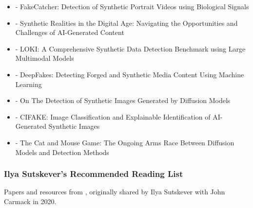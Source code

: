 \documentclass[
  letterpaper,
  DIV=11,
  numbers=noendperiod]{scrartcl}
\providecommand{\tightlist}{%
  \setlength{\itemsep}{0pt}\setlength{\parskip}{0pt}}
\begin{document}
\begin{itemize}
\tightlist
\item
  \autocite{9141516} - FakeCatcher: Detection of Synthetic Portrait
  Videos using Biological Signals
\item
  \autocite{unknown} - Synthetic Realities in the Digital Age:
  Navigating the Opportunities and Challenges of AI-Generated Content
\item
  \autocite{ye2025lokicomprehensivesyntheticdata} - LOKI: A
  Comprehensive Synthetic Data Detection Benchmark using Large
  Multimodal Models
\item
  \autocite{Zobaed2021} - DeepFakes: Detecting Forged and Synthetic
  Media Content Using Machine Learning
\item
  \autocite{10095167} - On The Detection of Synthetic Images Generated
  by Diffusion Models
\item
  \autocite{10409290} - CIFAKE: Image Classification and Explainable
  Identification of AI-Generated Synthetic Images
\item
  \autocite{laurier2024catmousegameongoing} - The Cat and Mouse Game:
  The Ongoing Arms Race Between Diffusion Models and Detection Methods
\end{itemize}

\subsubsection{Ilya Sutskever's Recommended Reading
List}\label{ilya-sutskevers-recommended-reading-list}

Papers and resources from \autocite{dzyim2023ilyasutskeverreading},
originally shared by Ilya Sutskever with John Carmack in 2020.
\end{document}
